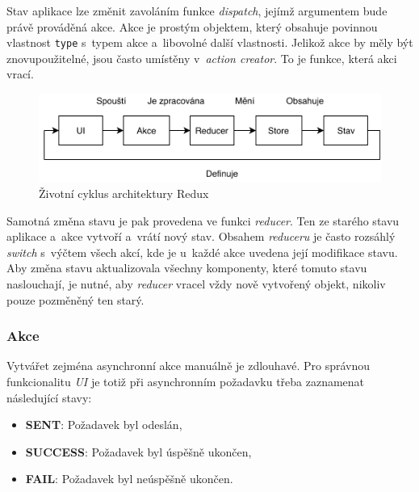 \documentclass[a4paper,12pt]{article}
\def\code#1{\texttt{#1}}
\begin{document}
Stav aplikace lze změnit zavoláním funkce \textit{dispatch}, jejímž argumentem bude právě prováděná akce. Akce je prostým objektem, který obsahuje povinnou vlastnost \code{type} s~typem akce a~libovolné další vlastnosti. Jelikož akce by měly být znovupoužitelné, jsou často umístěny v~\textit{action creator}. To je funkce, která akci vrací.~\cite{reactbook}

\begin{figure}[H]
\begin{center}
\includegraphics[width=350pt]{Images/Redux.png}
\caption[Životní cyklus architektury Redux]{Životní cyklus architektury Redux \footnotemark}
\end{center}
\end{figure}


Samotná změna stavu je pak provedena ve funkci \textit{reducer}. Ten ze starého stavu aplikace a~akce vytvoří a~vrátí nový stav.  Obsahem \textit{reduceru} je často rozsáhlý \textit{switch} s~výčtem všech akcí, kde je u~každé akce uvedena její modifikace stavu. Aby změna stavu aktualizovala všechny komponenty, které tomuto stavu naslouchají, je nutné, aby \textit{reducer} vracel vždy nově vytvořený objekt, nikoliv pouze pozměněný ten starý.~\cite{reactbook}



\subsubsection{Akce}

Vytvářet zejména asynchronní akce manuálně je zdlouhavé. Pro správnou funkcionalitu \textit{UI} je totiž při asynchronním požadavku třeba zaznamenat následující stavy:

\begin{itemize}
\item \textbf{SENT}: Požadavek byl odeslán,
\item \textbf{SUCCESS}: Požadavek byl úspěšně ukončen,
\item \textbf{FAIL}: Požadavek byl neúspěšně ukončen.
\end{itemize}
\end{document}
